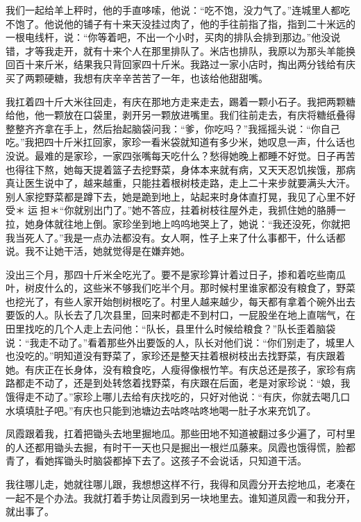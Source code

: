 \documentclass[12pt,UTF8]{ctexbook}
\begin{document}
我们一起给羊上秤时，他的手直哆嗦，他说：“吃不饱，没力气了。”连城里人都吃不饱了。他说他的铺子有十来天没挂过肉了，他的手往前指了指，指到二十米远的一根电线杆，说：“你等着吧，不出一个小时，买肉的排队会排到那边。”他没说错，才等我走开，就有十来个人在那里排队了。米店也排队，我原以为那头羊能换回百十来斤米，结果我只背回家四十斤米。我路过一家小店时，掏出两分钱给有庆买了两颗硬糖，我想有庆辛辛苦苦了一年，也该给他甜甜嘴。

我扛着四十斤大米往回走，有庆在那地方走来走去，踢着一颗小石子。我把两颗糖给他，他一颗放在口袋里，剥开另一颗放进嘴里。我们往前走去，有庆将糖纸叠得整整齐齐拿在手上，然后抬起脑袋问我：“爹，你吃吗？”我摇摇头说：“你自己吃。”我把四十斤米扛回家，家珍一看米袋就知道有多少米，她叹息一声，什么话也没说。最难的是家珍，一家四张嘴每天吃什么？愁得她晚上都睡不好觉。日子再苦也得往下熬，她每天提着篮子去挖野菜，身体本来就有病，又天天忍饥挨饿，那病真让医生说中了，越来越重，只能拄着根树枝走路，走上二十来步就要满头大汗。别人家挖野菜都是蹲下去，她是跪到地上，站起来时身体直打晃，我见了心里不好受＊运担＊“你就别出门了。”她不答应，拄着树枝往屋外走，我抓住她的胳膊一拉，她身体就往地上倒。家珍坐到地上呜呜地哭上了，她说：“我还没死，你就把我当死人了。”我是一点办法都没有。女人啊，性子上来了什么事都干，什么话都说。我不让她干活，她就觉得是在嫌弃她。

没出三个月，那四十斤米全吃光了。要不是家珍算计着过日子，掺和着吃些南瓜叶，树皮什么的，这些米不够我们吃半个月。那时候村里谁家都没有粮食了，野菜也挖光了，有些人家开始刨树根吃了。村里人越来越少，每天都有拿着个碗外出去要饭的人。队长去了几次县里，回来时都走不到村口，一屁股坐在地上直喘气，在田里找吃的几个人走上去问他：“队长，县里什么时候给粮食？”队长歪着脑袋说：“我走不动了。”看着那些外出要饭的人，队长对他们说：“你们别走了，城里人也没吃的。”明知道没有野菜了，家珍还是整天拄着根树枝出去找野菜，有庆跟着她。有庆正在长身体，没有粮食吃，人瘦得像根竹竿。有庆总还是孩子，家珍有病路都走不动了，还是到处转悠着找野菜，有庆跟在后面，老是对家珍说：“娘，我饿得走不动了。”家珍上哪儿去给有庆找吃的，只好对他说：“有庆，你就去喝几口水填填肚子吧。”有庆也只能到池塘边去咕咚咕咚地喝一肚子水来充饥了。

凤霞跟着我，扛着把锄头去地里掘地瓜。那些田地不知道被翻过多少遍了，可村里的人还都用锄头去掘，有时干一天也只是掘出一根烂瓜藤来。凤霞也饿得慌，脸都青了，看她挥锄头时脑袋都掉下去了。这孩子不会说话，只知道干活。

我往哪儿走，她就往哪儿跟，我想想这样不行，我得和凤霞分开去挖地瓜，老凑在一起不是个办法。我就打着手势让凤霞到另一块地里去。谁知道凤霞一和我分开，就出事了。
\end{document}

